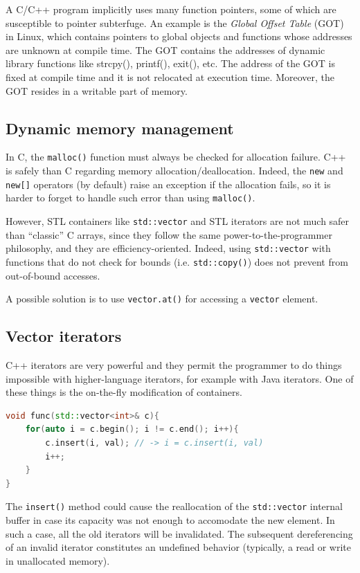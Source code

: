 \documentclass[a4paper,12pt]{article}
\begin{document}
A C/C++ program implicitly uses many function pointers, some of which are susceptible to pointer subterfuge. An example is the \textit{Global Offset Table} (GOT) in Linux, which contains pointers to global objects and functions whose addresses are unknown at compile time. The GOT contains the addresses of dynamic library functions like strcpy(), printf(), exit(), etc. The address of the GOT is fixed at compile time and it is not relocated at execution time. Moreover, the GOT resides in a writable part of memory.

\subsection{Dynamic memory management}
In C, the \texttt{malloc()} function must always be checked for allocation failure. C++ is safely than C regarding memory allocation/deallocation. Indeed, the \texttt{new} and \texttt{new[]} operators (by default) raise an exception if the allocation fails, so it is harder to forget to handle such error than using \texttt{malloc()}.

However, STL containers like \texttt{std::vector} and STL iterators are not much safer than “classic” C arrays, since they follow the same power-to-the-programmer philosophy, and they are efficiency-oriented. Indeed, using \texttt{std::vector} with functions that do not check for bounds (i.e. \texttt{std::copy()}) does not prevent from out-of-bound accesses.

A possible solution is to use \texttt{vector.at()} for accessing a \texttt{vector} element.

\subsection{Vector iterators}
C++ iterators are very powerful and they permit the programmer to do things impossible with higher-language iterators, for example with Java iterators. One of these things is the on-the-fly modification of containers.

\begin{lstlisting}[language=C++, basicstyle=\ttfamily]
void func(std::vector<int>& c){
	for(auto i = c.begin(); i != c.end(); i++){
		c.insert(i, val); // -> i = c.insert(i, val)
		i++;
	}
}
\end{lstlisting}

The \texttt{insert()} method could cause the reallocation of the \texttt{std::vector} internal buffer in case its capacity was not enough to accomodate the new element. In such a case, all the old iterators will be invalidated. The subsequent dereferencing of an invalid iterator constitutes an undefined behavior (typically, a read or write in unallocated memory).
\end{document}

